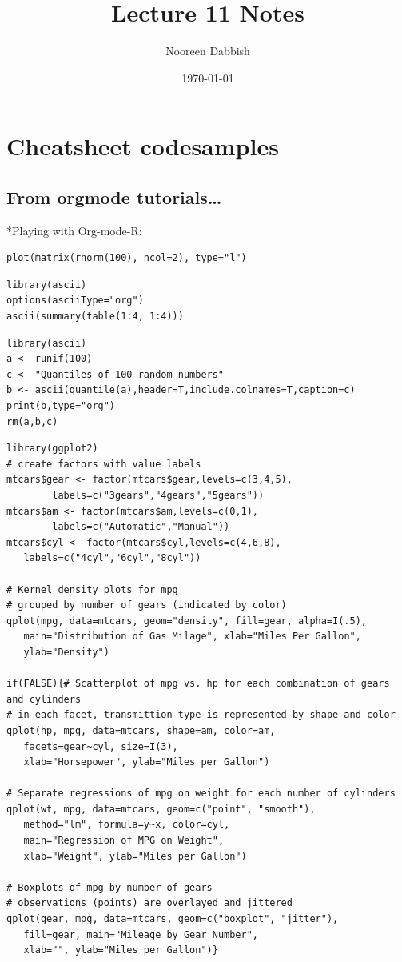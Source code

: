 \documentclass[11pt]{article}
\title{Lecture 11 Notes}
\author{Nooreen Dabbish}
\date{\today}
\begin{document}
\maketitle



\section{Cheatsheet codesamples}
\label{sec-1}
\subsection{From orgmode tutorials\ldots{}}
\label{sec-1-1}


*Playing with Org-mode-R:

\begin{verbatim}
plot(matrix(rnorm(100), ncol=2), type="l")
\end{verbatim}


\begin{verbatim}
library(ascii)
options(asciiType="org")
ascii(summary(table(1:4, 1:4)))
\end{verbatim}


\begin{verbatim}
library(ascii)
a <- runif(100)
c <- "Quantiles of 100 random numbers"
b <- ascii(quantile(a),header=T,include.colnames=T,caption=c)
print(b,type="org")
rm(a,b,c)
\end{verbatim}


\begin{verbatim}
library(ggplot2)
# create factors with value labels 
mtcars$gear <- factor(mtcars$gear,levels=c(3,4,5),
        labels=c("3gears","4gears","5gears")) 
mtcars$am <- factor(mtcars$am,levels=c(0,1),
        labels=c("Automatic","Manual")) 
mtcars$cyl <- factor(mtcars$cyl,levels=c(4,6,8),
   labels=c("4cyl","6cyl","8cyl")) 

# Kernel density plots for mpg
# grouped by number of gears (indicated by color)
qplot(mpg, data=mtcars, geom="density", fill=gear, alpha=I(.5), 
   main="Distribution of Gas Milage", xlab="Miles Per Gallon", 
   ylab="Density")

if(FALSE){# Scatterplot of mpg vs. hp for each combination of gears and cylinders
# in each facet, transmittion type is represented by shape and color
qplot(hp, mpg, data=mtcars, shape=am, color=am, 
   facets=gear~cyl, size=I(3),
   xlab="Horsepower", ylab="Miles per Gallon") 

# Separate regressions of mpg on weight for each number of cylinders
qplot(wt, mpg, data=mtcars, geom=c("point", "smooth"), 
   method="lm", formula=y~x, color=cyl, 
   main="Regression of MPG on Weight", 
   xlab="Weight", ylab="Miles per Gallon")

# Boxplots of mpg by number of gears 
# observations (points) are overlayed and jittered
qplot(gear, mpg, data=mtcars, geom=c("boxplot", "jitter"), 
   fill=gear, main="Mileage by Gear Number",
   xlab="", ylab="Miles per Gallon")}
\end{verbatim}
\end{document}
